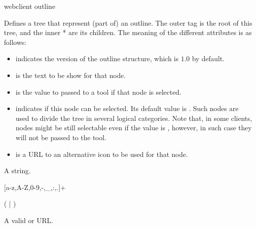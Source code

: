 \bigskip
\xmlstruct
{webclient}
{outline}
{%
%
  Defines a tree that represent (part of) an outline. The outer
   tag is the root of this tree, and the inner
  * are its children. The meaning of
  the different attributes is as follows:
%
\begin{itemize}
  \item {} indicates the version of the outline
  structure, which is $1.0$ by default.
  \item {} is the text to be show for that node.
  \item {} is the value to passed to a tool if that node is selected.
  \item {} indicates if this node can be
    selected. Its default value is . Such nodes
    are used to divide the tree in several logical categories.  Note
    that, in some clients, nodes might be still selectable even if the
    value is , however, in such case they will
    not be passed to the tool.
  \item {} is a URL to an alternative icon to be
    used for that node.
\end{itemize}
%
\bigskip
\noindent
{}

A string.

\bigskip
\noindent
{}

[a-z,A-Z,0-9,-,\_,:,.]+

\bigskip
\noindent
{}

(  |  )

\bigskip
\noindent
{}

A valid  or  URL.
}

